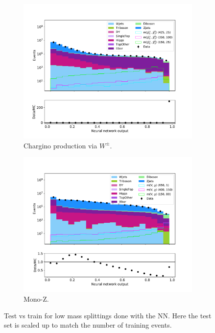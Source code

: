 \begin{figure}[H]
\begin{subfigure}[t!]{0.49\textwidth}
        \label{fig:SlepsnuNNLow}
    \end{subfigure}      
    \begin{subfigure}[t!]{0.49\textwidth}
        \includegraphics[width = \textwidth]{Figures/Stacked/stackedplot_NN_High_level_WW.pdf}
        \caption{Chargino production via $W^\pm$.}
        \label{fig:WWNNLow}
    \end{subfigure}
    \begin{subfigure}[t!]{0.49\textwidth}
        \includegraphics[width = \textwidth]{Figures/Stacked/stackedplot_NN_High_level_monoZ.pdf}
        \caption{Mono-Z.}
        \label{fig:MonoZNNLow}
    \end{subfigure}
    \caption{Test vs train for low mass splittings done with the NN. Here the test set is scaled up to match the number of training events.}
    \label{fig:AllLowNN}
\end{figure}



